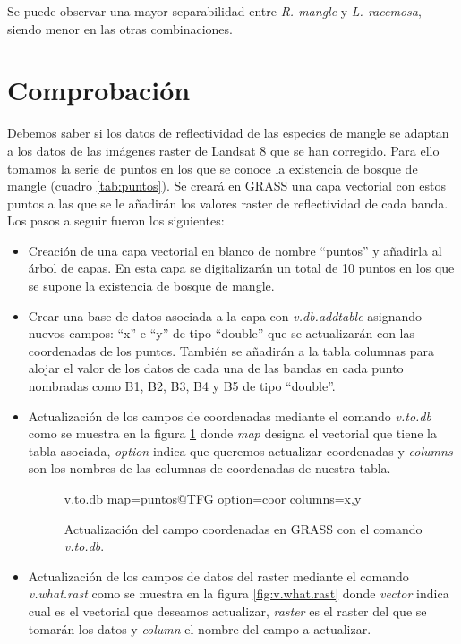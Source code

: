 Se puede observar una mayor separabilidad entre \textit{R. mangle} y \textit{L. racemosa}, siendo menor en las otras combinaciones.

\section{Comprobación}
Debemos saber si los datos de reflectividad de las especies de mangle se adaptan a los datos de las imágenes raster de Landsat 8 que se han corregido. Para ello tomamos la serie de puntos en los que se conoce la existencia de bosque de mangle (cuadro \ref{tab:puntos}). Se creará en GRASS una capa vectorial con estos puntos a las que se le añadirán los valores raster de reflectividad de cada banda. Los pasos a seguir fueron los siguientes:

\begin{itemize}
	\item Creación de una capa vectorial en blanco de nombre ``puntos'' y añadirla al árbol de capas. En esta capa se digitalizarán un total de 10 puntos en los que se supone la existencia de bosque de mangle.
	\item Crear una base de datos asociada a la capa con \textit{v.db.addtable} asignando nuevos campos: ``x'' e ``y'' de tipo ``double'' que se actualizarán con las coordenadas de los puntos. También se añadirán a la tabla columnas para alojar el valor de los datos de cada una de las bandas en cada punto nombradas como B1, B2, B3, B4 y B5 de tipo ``double''.
	\item Actualización de los campos de coordenadas mediante el comando \textit{v.to.db} como se muestra en la figura \ref{fig:v.to.db} donde \textit{map} designa el vectorial que tiene la tabla asociada, \textit{option} indica que queremos actualizar coordenadas y \textit{columns} son los nombres de las columnas de coordenadas de nuestra tabla.
	
\begin{figure}[ht]
\centering
\begin{boxedverbatim}
	v.to.db map=puntos@TFG option=coor columns=x,y
\end{boxedverbatim}
\caption[Actualización de coordenadas]{Actualización del campo coordenadas en GRASS con el comando \textit{v.to.db}.}
\label{fig:v.to.db}
\end{figure}	
	
	\item Actualización de los campos de datos del raster mediante el comando \textit{v.what.rast} como se muestra en la figura \ref{fig:v.what.rast} donde \textit{vector} indica cual es el vectorial que deseamos actualizar, \textit{raster} es el raster del que se tomarán los datos y \textit{column} el nombre del campo a actualizar.
\end{itemize}

